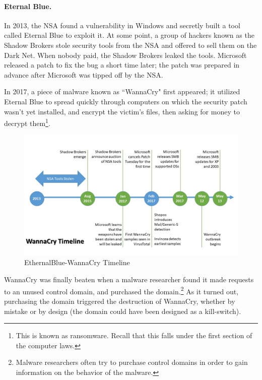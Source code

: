 \paragraph{Eternal Blue.} In 2013, the NSA found a vulnerability in Windows \cite{CVE-2017-0144} and secretly built a tool called Eternal Blue to exploit it. At some point, a group of hackers known as the Shadow Brokers stole security tools from the NSA and offered to sell them on the Dark Net. When nobody paid, the Shadow Brokers leaked the tools. Microsoft released a patch to fix the bug a short time later; the patch was prepared in advance after Microsoft was tipped off by the NSA.

In 2017, a piece of malware known as ``WannaCry" first appeared; it utilized Eternal Blue to spread quickly through computers on which the security patch wasn't yet installed, and encrypt the victim's files, then asking for money to decrypt them\footnote{This is known as ransomware. Recall that this falls under the first section of the computer laws.}.

\begin{figure}[!ht]
    \centering
    \includegraphics[width=\textwidth]{images/EthernalBlue-WannaCry_Timeline.jpg}
    \caption{EthernalBlue-WannaCry Timeline} \label{fig:wannacry_timeline}
\end{figure}

WannaCry was finally beaten when a malware researcher found it made requests to an unused control domain, and purchased the domain.\footnote{Malware researchers often try to purchase control domains in order to gain information on the behavior of the malware.} As it turned out, purchasing the domain triggered the destruction of WannaCry, whether by mistake or by design (the domain could have been designed as a kill-switch).

